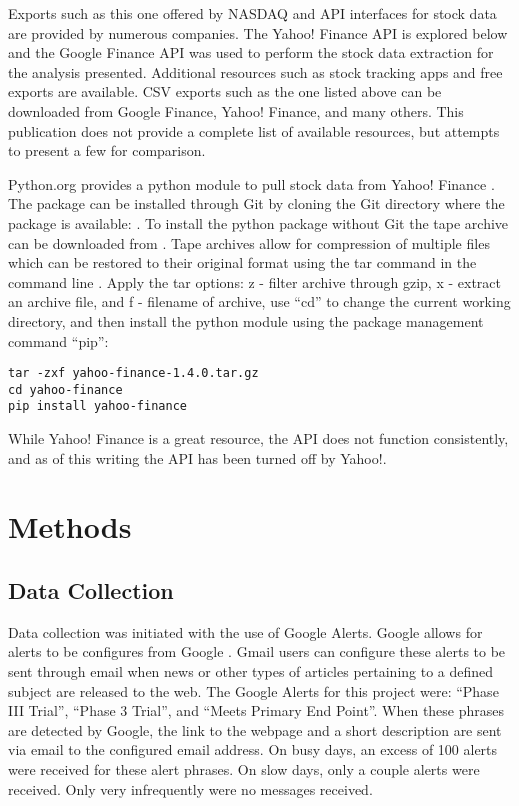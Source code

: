 \documentclass[sigconf]{acmart}
\begin{document}
Exports such as this one offered by NASDAQ and API interfaces for stock data are provided by numerous companies. The Yahoo! Finance API is explored below and the Google Finance API was used to perform the stock data extraction for the analysis presented. Additional resources such as stock tracking apps and free exports are available. CSV exports such as the one listed above can be downloaded from Google Finance, Yahoo! Finance, and many others. This publication does not provide a complete list of available resources, but attempts to present a few for comparison. 

Python.org provides a python module to pull stock data from Yahoo! Finance \cite{www-python-yahoo}. The package can be installed through Git by cloning the Git directory where the package is available: \cite{www-yahooStock}. To install the python package without Git the tape archive can be downloaded from \cite{www-pythonYahooStock}.  Tape archives allow for compression of multiple files which can be restored to their original format using the tar command in the command line \cite{www-tar}.  Apply the tar options: z - filter archive through gzip, x - extract an archive file, and f - filename of archive, use ``cd'' to change the current working directory, and then install the python module using the package management command ``pip'':
\begin{lstlisting}
tar -zxf yahoo-finance-1.4.0.tar.gz
cd yahoo-finance
pip install yahoo-finance
\end{lstlisting}
While Yahoo! Finance is a great resource, the API does not function consistently, and as of this writing the API has been turned off by Yahoo!.


\section{Methods}
\subsection{Data Collection}
Data collection was initiated with the use of Google Alerts. Google allows for alerts to be configures from Google \cite{www-googleAlerts}. Gmail users can configure these alerts to be sent through email when news or other types of articles pertaining to a defined subject are released to the web. The Google Alerts for this project were: ``Phase III Trial'', ``Phase 3 Trial'', and ``Meets Primary End Point''. When these phrases are detected by Google, the link to the webpage and a short description are sent via email to the configured email address. On busy days, an excess of 100 alerts were received for these alert phrases. On slow days, only a couple alerts were received.  Only very infrequently were no messages received. 
\end{document}
